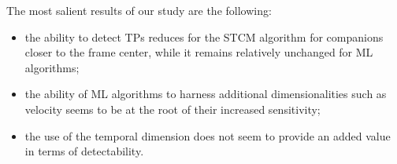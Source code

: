 \documentclass{aa}
\begin{document}
The most salient results of our study are the following:
\begin{itemize}
    \item the ability to detect TPs reduces for the STCM algorithm for companions closer to the frame center, while it remains relatively unchanged for ML algorithms;
    \item the ability of ML algorithms to harness additional dimensionalities such as velocity seems to be at the root of their increased sensitivity;
    \item the use of the temporal dimension does not seem to provide an added value in terms of detectability.%
\end{itemize}
\end{document}
